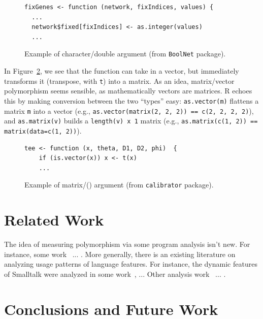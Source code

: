 \documentclass[acmsmall,10pt,review,anonymous]{acmart}\settopmatter{printfolios=true,printccs=false,printacmref=false}
\newcommand{\code}[1]{\lstinline|#1|\xspace}
\begin{document}
\begin{figure}[!hb]{\small\begin{lstlisting}[style=R]
fixGenes <- function (network, fixIndices, values) {
  ...
  network$fixed[fixIndices] <- as.integer(values)
  ...
\end{lstlisting}}\caption{Example of character/double argument (from {\tt BoolNet} package).}\label{fig:chardbl}\end{figure}%
In Figure~\ref{fig:matvec}, we see that the function can take in a vector,
but immediately transforms it (transpose, with {\tt t}) into a matrix.  As
an idea, matrix/vector polymorphism seems sensible, as mathematically
vectors are matrices.  R echoes this by making conversion between the two
``types'' easy: \code{as.vector(m)} flattens a matrix \code{m} into a vector
(e.g., \code{as.vector(matrix(2, 2, 2)) == c(2, 2, 2, 2)}), and
\code{as.matrix(v)} builds a {\tt length(v) x 1} matrix (e.g.,
\code{as.matrix(c(1, 2)) == matrix(data=c(1, 2))}).  
\begin{figure}[!hb]{\small\begin{lstlisting}[style=R]
tee <- function (x, theta, D1, D2, phi)  {
    if (is.vector(x)) x <- t(x)
    ...
\end{lstlisting}}\caption{Example of matrix/(\D) argument (from {\tt calibrator} package).}\label{fig:matvec}\end{figure}
%
%
%
%
\section{Related Work}
The idea of measuring polymorphism via some program analysis isn't new.
For instance, some work~\cite{aakerblom2015measuring} ... .
More generally, there is an existing literature on analyzing usage patterns
of language features.  For instance, the dynamic features of Smalltalk were
analyzed in some work~\cite{callau2011howdevelopers}, ...
Other analysis work~\cite{milojkovic2017duck} ... .
\section{Conclusions and Future Work}


\end{document}
